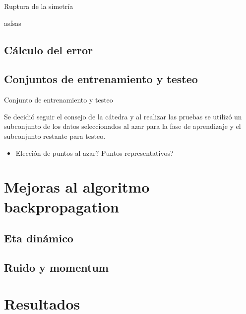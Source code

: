 \documentclass{beamer}
\begin{document}
\begin{frame}{Ruptura de la simetría}
\par asfsas
\end{frame}

\subsection{Cálculo del error}

\subsection{Conjuntos de entrenamiento y testeo}
\begin{frame}{Conjunto de entrenamiento y testeo}
\par Se decidió seguir el consejo de la cátedra y al realizar las pruebas se utilizó un subconjunto de los datos seleccionados al azar para la fase de aprendizaje y el subconjunto restante para testeo.

\begin{itemize}
\item Elección de puntos al azar? Puntos representativos?
\end{itemize}
\end{frame}

\section{Mejoras al algoritmo backpropagation}
\subsection{Eta dinámico}
\subsection{Ruido y momentum}

\section{Resultados}
\end{document}
